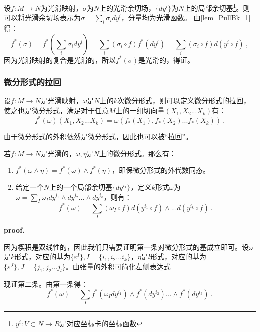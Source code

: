 设$f:M\rightarrow N$为光滑映射，$\sigma$为$N$上的光滑余切场，$\{dy^i\}$为$N$上的局部余切基\footnote{$y^i:V\subset N\rightarrow R$是对应坐标卡的坐标函数}。则可以将光滑余切场表示为$\sigma=\sum_i\sigma_idy^i $，分量均为光滑函数。
由\autoref{lem_PullBk_1} 得：
\begin{equation}
f^*(\sigma)=f^*(\sum_i\sigma_idy^i)=\sum_i(\sigma_i\circ f)f^*(dy^i)=\sum_i(\sigma_i\circ f)d(y^i\circ f)~,
\end{equation}
因为光滑映射的复合是光滑的，所以$f^*(\sigma)$是光滑的，得证。
\subsubsection{微分形式的拉回}
\begin{definition}{}
设$f:M\rightarrow N$是光滑映射，$\omega$是$N$上的$k$次微分形式，则可以定义微分形式的拉回，使之也是微分形式，满足对于任意$M$上的一组切向量$(X_1,X_2...X_k)$有：
\begin{equation}
f^*(\omega)(X_1,X_2...X_k)=\omega(f_*(X_1),f_*(X_2)...f_*(X_k))~.
\end{equation}
\end{definition}
由于微分形式的外积依然是微分形式，因此也可以被“拉回”。
\begin{theorem}{}
若$f:M\rightarrow N$是光滑的，$\omega,\eta$是$N$上的微分形式。那么有：
\begin{enumerate}
\item $f^*(\omega\wedge \eta)=f^*(\omega)\wedge f^*(\eta)$，即保微分形式的外代数同态。
\item 给定一个$N$上的一个局部余切基$\{dy^{i_1}\}$，定义$k$形式$\omega$为$\omega=\sum_I\omega_I dy^{i_1}\wedge dy^{i_2}...\wedge dy^{i_k}$，则有：
\begin{equation}
f^*(\omega)=\sum_I (\omega_I\circ f)d(y^{i_1}\circ f)\wedge...d(y^{i_k}\circ f)~.
\end{equation}
\end{enumerate}


\end{theorem}
\textbf{proof.}

因为楔积是双线性的，因此我们只需要证明第一条对微分形式的基成立即可。设$\omega$是$k$形式，对应的基为$\{\varepsilon^I\},I=\{i_1,i_2...i_k\}$，$\eta$是$l$形式，对应的基为$\{\varepsilon^J\},J=\{j_1,j_2...j_l\}$。由张量的外积可简化左侧表达式

现证第二条。由第一条得：
\begin{equation}
f^*(\omega)=\sum_If^*(\omega_I dy^{i_1} )\wedge f^*(dy^{i_2})...\wedge f^*(dy^{i_k})~.
\end{equation}

